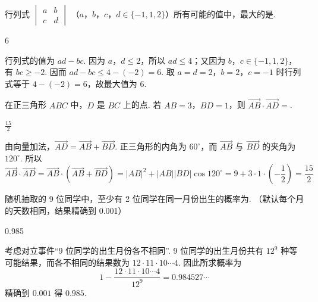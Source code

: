 \begin{problem}
行列式 \(\begin{vmatrix}a & b\\ c & d \end{vmatrix}\) （\(a\)，\(b\)，\(c\)，\(d\in \{-1,1,2\}\)）所有可能的值中，最大的是\fillinblank{}.
\end{problem}

\begin{answer}
6
\end{answer}

\begin{solution}
行列式的值为 \(ad-bc\). 因为 \(a\)，\(d\leqslant2\)，所以 \(ad\leqslant4\)；又因为 \(b\)，\(c\in\{-1,1,2\}\)，有 \(bc\geqslant-2\). 因而 \(ad-bc\leqslant4-(-2)=6\). 取 \(a=d=2\)，\(b=2\)，\(c=-1\) 时行列式等于 \(4-(-2)=6\)，故最大值为 \(6\).
\end{solution}

\begin{problem}
在正三角形 \(ABC\) 中，\(D\) 是 \(BC\) 上的点. 若 \(AB = 3\)，\(BD = 1\)，则 \(\overrightarrow{AB} \cdot \overrightarrow{AD} =\)\fillinblank{}.
\end{problem}

\begin{answer}
\(\frac{15}{2}\)
\end{answer}

\begin{solution}
由向量加法，\(\overrightarrow{AD}=\overrightarrow{AB}+\overrightarrow{BD}\). 正三角形的内角为 \(60^{\circ}\)，而 \(\overrightarrow{AB}\) 与 \(\overrightarrow{BD}\) 的夹角为 \(120^{\circ}\). 所以
\[
\overrightarrow{AB}\cdot\overrightarrow{AD}=\overrightarrow{AB}\cdot\left(\overrightarrow{AB}+\overrightarrow{BD}\right)=|AB|^2+|AB||BD|\cos120^{\circ}=9+3\cdot1\cdot\left(-\frac12\right)=\frac{15}{2}
\]
\end{solution}

\begin{problem}
随机抽取的 9 位同学中，至少有 2 位同学在同一月份出生的概率为\fillinblank{}. （默认每个月的天数相同，结果精确到 0.001）
\end{problem}

\begin{answer}
0.985
\end{answer}

\begin{solution}
考虑对立事件“9 位同学的出生月份各不相同”. 9 位同学的出生月份共有 \(12^9\) 种等可能结果，而各不相同的结果数为 \(12\cdot11\cdot10\cdots4\). 因此所求概率为
\[
1-\frac{12\cdot11\cdot10\cdots4}{12^9}=0.984527\cdots
\]
精确到 \(0.001\) 得 \(0.985\).
\end{solution}


